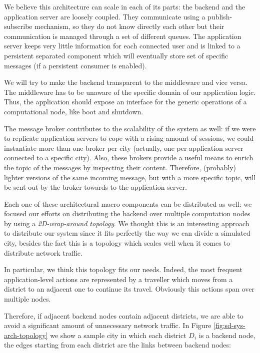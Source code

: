 We believe this architecture can scale in each of its parts: the backend and
the application server are loosely coupled. They communicate using a
publish-subscribe mechanism, so they do not know directly each other but their
communication is managed through a set of different queues.
The application server keeps very little information for
each connected user and is linked to a persistent separated component
which will eventually store set of specific messages
(if a persistent consumer is enabled).

We will try to make the backend transparent to the middleware and vice versa.
The middleware has to be unaware
of the specific domain of our application logic.
Thus, the application should expose an interface for the generic operations of
a computational node, like boot and shutdown.

The message broker contributes to the scalability of the system as well: if we
were to replicate application servers to cope with a rising amount of
sessions, we could instantiate more than one broker per city (actually, one
per application server connected to a specific city).
Also, these brokers provide a useful means to enrich the topic of the messages
by inspecting their content. Therefore, (probably) lighter versions of the
same incoming message, but with a more specific topic, will be sent out by the
broker towards to the application server.

Each one of these architectural macro components can be distributed as well: we
focused our efforts on distributing the backend over multiple computation nodes
by using a \textit{2D-wrap-around topology}.
We thought this is an interesting approach to distribute our system since it
fits perfectly the way we can divide a simulated city, besides the fact this is
a topology which scales well when it comes to distribute network traffic.

In particular, we think this topology fits our needs. Indeed, the
most frequent application-level actions are
represented by a traveller which moves from a district to an
adjacent one to continue its travel. Obviously this actions span over
multiple nodes.

Therefore, if adjacent backend nodes contain adjacent districts, we are able to
avoid a significant amount of unnecessary network traffic. In Figure
\ref{fig:sd-sys-arch-topology} we show a sample city in which each district
$D_i$ is a backend node, the edges starting from each district are the links
between backend nodes:

